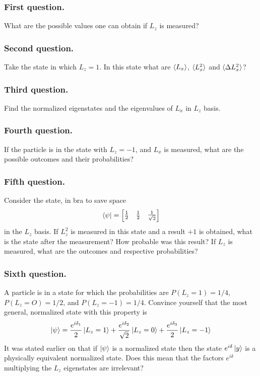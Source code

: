 \documentclass[../../../main.tex]{subfiles}
\begin{document}
\subsubsection{First question.}
What are the possible values one can obtain if $L_z$ is measured?
\subsubsection{Second question.}
Take the state in which $L_z=1$. 
In this state what are $\braket{L_x}$, $\braket{L_x^2}$ and $\braket{\Delta L_x^2}$?

\subsubsection{Third question.}
Find the normalized eigenstates and the eigenvalues of $L_x$ in $L_z$ basis.

\subsubsection{Fourth question.}
If the particle is in the state with $L_z = -1$, and $L_x$ is measured, what are the possible outcomes and their probabilities?

\subsubsection{Fifth question.}
Consider the state, in bra to save space 
\begin{equation*}
    \bra{\psi}=\begin{bmatrix}
        \frac{1 }{2}&\frac{1 }{2}&\frac{1 }{\sqrt{2}}
    \end{bmatrix}
\end{equation*}
in the $L_z$ basis.
If $L_z^2$ is measured in this state and a result $+1$ is obtained, what is the state after the measurement? 
How probable was this result? 
If $L_z$ is measured, what are the outcomes and respective probabilities?

\subsubsection{Sixth question.}
A particle is in a state for which the probabilities are $P(L_z=1)=1/4$, $P(L_z=O)=1/2$, and $P(L_z =-1)= 1 /4$. 
Convince yourself that the most general, normalized state with this property is
\begin{equation*}
    \ket{\psi}=\frac{e^{i\delta_1 }}{2 }\ket{L_z=1}+\frac{e^{i \delta_2 }}{\sqrt{2 }}\ket{L_z=0}+\frac{e^{i \delta_3 }}{2}\ket{L_z=-1}
\end{equation*}
It was stated earlier on that if $\ket{\psi}$ is a normalized state then the state $e^{i\delta}\ket{y}$ is a physically equivalent normalized state. 
Does this mean that the factors $e^{i\delta}$ multiplying the $L_z$ eigenstates are irrelevant?
\end{document}

